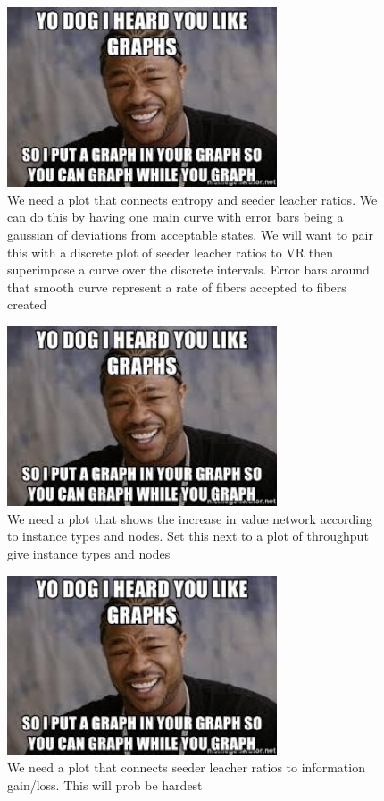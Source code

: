 \documentclass{article}
\begin{document}
\begin{figure}[h]
\caption{We need a plot that connects entropy and seeder leacher ratios. We can do this by having one main curve with error bars being a gaussian of deviations from acceptable states. We will want to pair this with a discrete plot of seeder leacher ratios to VR then superimpose a curve over the discrete intervals. Error bars around that smooth curve represent a rate of fibers accepted to fibers created }
\includegraphics[width=8cm]{yo_dawg}
\centering
\end{figure}

\begin{figure}[h]
\caption{We need a plot that shows the increase in value network according to instance types and nodes. Set this next to a plot of throughput give instance types and nodes}
\includegraphics[width=8cm]{yo_dawg}
\centering
\end{figure}

\begin{figure}[h]
\caption{We need a plot that connects seeder leacher ratios to information gain/loss. This will prob be hardest}
\includegraphics[width=8cm]{yo_dawg}
\centering
\end{figure}


\end{document}
